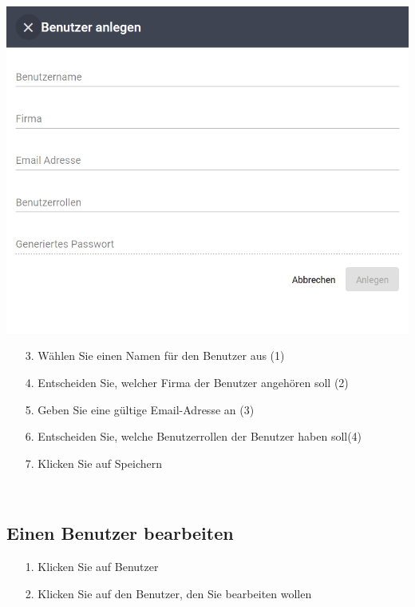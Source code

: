 \documentclass[11pt,a4paper]{report}
\begin{document}
	\begin{minipage}{0.5\linewidth}
	\includegraphics[width=\linewidth]{Benutzer.png}
	\end{minipage}
	\hfill
	\begin{minipage}{0.4\linewidth}
	\begin{itemize}
		\item[3.] Wählen Sie einen Namen für den Benutzer aus (1)
		\item[4.] Entscheiden Sie, welcher Firma der Benutzer angehören soll (2)
		\item[5.] Geben Sie eine gültige Email-Adresse an (3)
		\item[6.] Entscheiden Sie, welche Benutzerrollen der Benutzer haben soll(4)
		\item[7.] Klicken Sie auf Speichern
	\end{itemize}
	\end{minipage}\\

	\subsection{Einen Benutzer bearbeiten}

		\begin{itemize}
		\item[1.] Klicken Sie auf \glqq{}Benutzer\grqq{}
		\item[2.] Klicken Sie auf den Benutzer, den Sie bearbeiten wollen
	\end{itemize}
\end{document}
